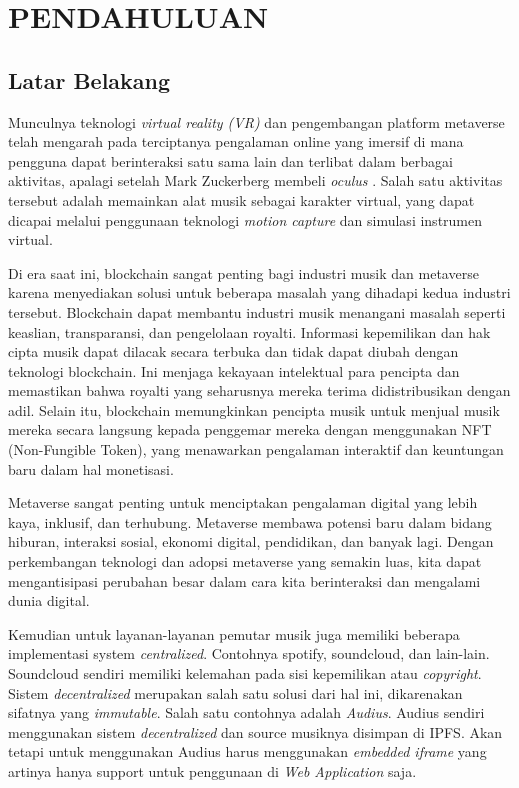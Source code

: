 \chapter{PENDAHULUAN}
\label{chap:pendahuluan}


\section{Latar Belakang}
\label{sec:latarbelakang}

Munculnya teknologi \emph{virtual reality (VR)} dan pengembangan platform metaverse telah mengarah pada terciptanya
pengalaman online yang imersif di mana pengguna dapat berinteraksi satu sama lain dan terlibat dalam berbagai aktivitas, apalagi setelah  Mark Zuckerberg
membeli \emph{oculus} \parencite{luckerson2014facebook}.
Salah satu aktivitas tersebut adalah memainkan alat musik sebagai karakter virtual, yang dapat dicapai melalui penggunaan
teknologi \emph{motion capture} dan simulasi instrumen virtual.

Di era saat ini, blockchain sangat penting bagi industri musik dan metaverse karena menyediakan solusi untuk beberapa masalah yang dihadapi kedua industri tersebut.
Blockchain dapat membantu industri musik menangani masalah seperti keaslian, transparansi, dan pengelolaan royalti. Informasi kepemilikan dan hak cipta musik dapat dilacak secara terbuka dan tidak dapat diubah dengan teknologi blockchain. Ini menjaga kekayaan intelektual para pencipta dan memastikan bahwa royalti yang seharusnya mereka terima didistribusikan dengan adil. Selain itu, blockchain memungkinkan pencipta musik untuk menjual musik mereka secara langsung kepada penggemar mereka dengan menggunakan NFT (Non-Fungible Token), yang menawarkan pengalaman interaktif dan keuntungan baru dalam hal monetisasi.

Metaverse sangat penting untuk menciptakan pengalaman digital yang lebih kaya, inklusif, dan terhubung. Metaverse membawa potensi baru dalam bidang hiburan, interaksi sosial, ekonomi digital, pendidikan, dan banyak lagi. Dengan perkembangan teknologi dan adopsi metaverse yang semakin luas, kita dapat mengantisipasi perubahan besar dalam cara kita berinteraksi dan mengalami dunia digital.

Kemudian untuk layanan-layanan pemutar musik juga memiliki beberapa implementasi system \emph{centralized}. Contohnya spotify, soundcloud, dan lain-lain.
Soundcloud sendiri memiliki kelemahan pada sisi kepemilikan atau \emph{copyright}. Sistem \emph{decentralized} merupakan salah satu solusi dari hal ini, dikarenakan
sifatnya yang \emph{immutable}. Salah satu contohnya adalah \emph{Audius}. Audius sendiri menggunakan sistem \emph{decentralized} dan source musiknya disimpan di IPFS.
Akan tetapi untuk menggunakan Audius harus menggunakan \emph{embedded iframe} yang artinya hanya support untuk penggunaan di \emph{Web Application} saja.

